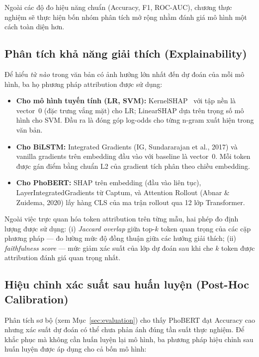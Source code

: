 Ngoài các độ đo hiệu năng chuẩn (Accuracy, F1, ROC-AUC), chương thực nghiệm sẽ thực hiện bốn nhóm phân tích mở rộng nhằm đánh giá mô hình một cách toàn diện hơn.

\subsection{Phân tích khả năng giải thích (Explainability)}

Để hiểu \emph{từ nào} trong văn bản có ảnh hưởng lớn nhất đến dự đoán của mỗi mô hình, ba họ phương pháp attribution được sử dụng:

\begin{itemize}[leftmargin=2em]
  \item \textbf{Cho mô hình tuyến tính (LR, SVM):} KernelSHAP~\cite{lundberg2017shap} với tập nền là vector~0 (đặc trưng vắng mặt) cho LR; LinearSHAP dựa trên trọng số mô hình cho SVM. Đầu ra là đóng góp log-odds cho từng n-gram xuất hiện trong văn bản.

  \item \textbf{Cho BiLSTM:} Integrated Gradients (IG, Sundararajan et al., 2017) và vanilla gradients trên embedding đầu vào với baseline là vector~0. Mỗi token được gán điểm bằng chuẩn L2 của gradient tích phân theo chiều embedding.

  \item \textbf{Cho PhoBERT:} SHAP trên embedding (đầu vào liên tục), LayerIntegratedGradients từ Captum, và Attention Rollout (Abnar \& Zuidema, 2020) lấy hàng CLS của ma trận rollout qua 12 lớp Transformer.
\end{itemize}

Ngoài việc trực quan hóa token attribution trên từng mẫu, hai phép đo định lượng được sử dụng: (i) \textit{Jaccard overlap} giữa top-$k$ token quan trọng của các cặp phương pháp --- đo lường mức độ đồng thuận giữa các hướng giải thích; (ii) \textit{faithfulness score} --- mức giảm xác suất của lớp dự đoán sau khi che $k$ token được attribution đánh giá quan trọng nhất.

\subsection{Hiệu chỉnh xác suất sau huấn luyện (Post-Hoc Calibration)}

Phân tích sơ bộ (xem Mục~\ref{sec:evaluation}) cho thấy PhoBERT đạt Accuracy cao nhưng xác suất dự đoán có thể chưa phản ánh đúng tần suất thực nghiệm. Để khắc phục mà không cần huấn luyện lại mô hình, ba phương pháp hiệu chỉnh sau huấn luyện được áp dụng cho cả bốn mô hình:

